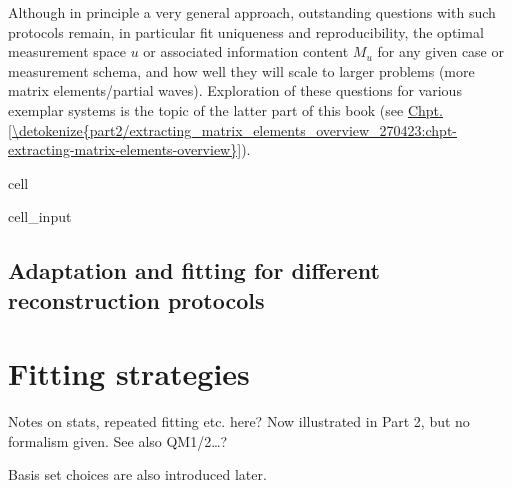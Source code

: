 \documentclass[letterpaper,table,10pt,english]{jupyterBook}
\begin{document}
\sphinxAtStartPar
Although in principle a very general approach, outstanding questions with such protocols remain, in particular fit uniqueness and reproducibility, the optimal measurement space \(u\) \sphinxhyphen{} or associated information content \(M_u\) \sphinxhyphen{} for any given case or measurement schema, and how well they will scale to larger problems (more matrix elements/partial waves). Exploration of these questions for various exemplar systems is the topic of the latter part of this book (see \hyperref[\detokenize{part2/extracting_matrix_elements_overview_270423:chpt-extracting-matrix-elements-overview}]{Chpt.\@ \ref{\detokenize{part2/extracting_matrix_elements_overview_270423:chpt-extracting-matrix-elements-overview}}}).

\begin{sphinxuseclass}{cell}\begin{sphinxVerbatimInput}

\begin{sphinxuseclass}{cell_input}
\begin{sphinxVerbatim}[commandchars=\\\{\}]
\end{sphinxVerbatim}

\end{sphinxuseclass}\end{sphinxVerbatimInput}

\end{sphinxuseclass}

\subsection{Adaptation and fitting for different reconstruction protocols}
\label{\detokenize{part1/numerics_070723:adaptation-and-fitting-for-different-reconstruction-protocols}}\label{\detokenize{part1/numerics_070723:sect-numerics-other-protocols}}

\section{Fitting strategies}
\label{\detokenize{part1/numerics_070723:fitting-strategies}}
\sphinxAtStartPar
Notes on stats, repeated fitting etc. here? Now illustrated in Part 2, but no formalism given. See also QM1/2…?

\sphinxAtStartPar
Basis set choices are also introduced later.
\end{document}
